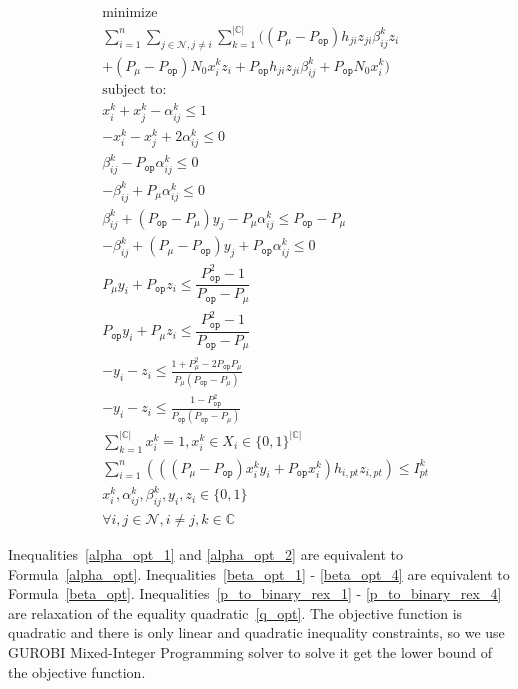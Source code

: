 \documentclass[times]{ettauth}
\theoremstyle{mytheoremstyle}
\theoremstyle{mytheoremstyle}
\theoremstyle{mytheoremstyle}
\begin{document}
			\begin{align}
			\label{scheme2optimizaiton}
			& \underset{}{\text{minimize}}\\
			&\sum\limits^{n}_{i=1}\sum\limits_{j\in\mathcal{N}, j\neq i}\sum\limits_{k=1}^{|\mathbb{C}|} ((P_\mu - P_{\mathtt{op}})h_{ji} z_{ji} \beta_{ij}^k z_i  \\
			&  + (P_\mu - P_{\mathtt{op}})N_0  x_i^k z_i + P_{\mathtt{op}}h_{ji} z_{ji} \beta_{ij}^k +  P_{\mathtt{op}}N_0x_i^k)\\
			& \text{subject to:} \\
			& x_i^k + x_j^k  - \alpha_{ij}^k\leq 1 \label{alpha_opt_1}\\
			& - x_i^k - x_j^k + 2 \alpha_{ij}^k \leq 0 \label{alpha_opt_2} \\
			& \beta_{ij}^k - P_{\mathtt{op}} \alpha_{ij}^k \leq 0 \label{beta_opt_1}\\
			& - \beta_{ij}^k + P_\mu \alpha_{ij}^k \leq 0 \label{beta_opt_2}\\
			& \beta_{ij}^k + (P_{\mathtt{op}} - P_\mu)y_j - P_\mu \alpha_{ij}^k \leq P_{\mathtt{op}}- P_\mu \label{beta_opt_3}\\	
			& -\beta_{ij}^k + (P_\mu - P_{\mathtt{op}})y_j + P_{\mathtt{op}} \alpha_{ij}^k \leq 0 \label{beta_opt_4}\\		
			& P_\mu y_i + P_{\mathtt{op}} z_i  \leq \dfrac{P_{\mathtt{op}}^2-1}{P_{\mathtt{op}} - P_\mu} \label{p_to_binary_rex_1}\\	
			& P_{\mathtt{op}} y_i + P_\mu z_i  \leq \dfrac{P_{\mathtt{op}}^2-1}{P_{\mathtt{op}} - P_\mu}\label{p_to_binary_rex_2}\\
			& -y_i - z_i  \leq \frac{1+P_\mu^2-2P_{\mathtt{op}}P_\mu  }{P_\mu (P_{\mathtt{op}} - P_\mu)} \label{p_to_binary_rex_3}\\
			& -y_i - z_i  \leq \frac{1- P_{\mathtt{op}}^2}{P_{\mathtt{op}}(P_{\mathtt{op}} - P_\mu) }\label{p_to_binary_rex_4}\\		
			& \sum\limits_{k=1}^{|\mathbb{C}|}x_i^k=1, x_i^k\in X_i\in \{0,1\}^{|\mathbb{C}|}\\
			& \sum\limits^{n}_{i=1} (((P_\mu - P_{\mathtt{op}})x_i^k y_i + P_{\mathtt{op}}x_i^k)h_{i,pt} z_{i,pt}) \leq  I^k_{pt}\\
			& x_i^k, \alpha_{ij}^k, \beta_{ij}^k, y_i, z_i \in \{0,1\}\\
			& \forall i, j\in \mathcal{N}, i\neq j, k\in \mathbb{C}
			\end{align}


Inequalities~\ref{alpha_opt_1} and \ref{alpha_opt_2} are equivalent to Formula~\ref{alpha_opt}.
Inequalities~\ref{beta_opt_1} - \ref{beta_opt_4} are equivalent to Formula~\ref{beta_opt}.
Inequalities~\ref{p_to_binary_rex_1} - \ref{p_to_binary_rex_4} are relaxation of the equality quadratic~\ref{q_opt}.
The objective function is quadratic and there is only linear and quadratic inequality constraints, so we use GUROBI Mixed-Integer Programming solver to solve it get the lower bound of the objective function.
\end{document}
